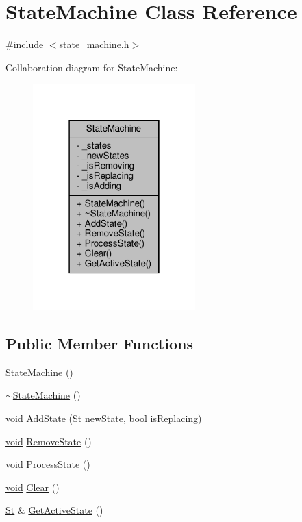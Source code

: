 \hypertarget{classStateMachine}{}\section{State\+Machine Class Reference}
\label{classStateMachine}


{\ttfamily \#include $<$state\+\_\+machine.\+h$>$}



Collaboration diagram for State\+Machine\+:
\nopagebreak
\begin{figure}[H]
\begin{center}
\leavevmode
\includegraphics[width=178pt]{classStateMachine__coll__graph}
\end{center}
\end{figure}
\subsection*{Public Member Functions}
\begin{DoxyCompactItemize}
\item 
\hyperlink{classStateMachine_a2fb07002510ea9141019559750acfab8}{State\+Machine} ()
\item 
\hyperlink{classStateMachine_a93d66cb2a89b186789d655a08b02674e}{$\sim$\+State\+Machine} ()
\item 
\hyperlink{imgui__impl__opengl3__loader_8h_ac668e7cffd9e2e9cfee428b9b2f34fa7}{void} \hyperlink{classStateMachine_a5efdf0c4ab0bdeae854ab9a0d071969b}{Add\+State} (\hyperlink{state__machine_8h_aa31b7a5a5d2d34ce28ae8e5c4624f788}{St} new\+State, bool is\+Replacing)
\item 
\hyperlink{imgui__impl__opengl3__loader_8h_ac668e7cffd9e2e9cfee428b9b2f34fa7}{void} \hyperlink{classStateMachine_aebefd3cef7db9e011e15f423061d1afc}{Remove\+State} ()
\item 
\hyperlink{imgui__impl__opengl3__loader_8h_ac668e7cffd9e2e9cfee428b9b2f34fa7}{void} \hyperlink{classStateMachine_a30f9ae4022e5177aeef777f4d7ea834f}{Process\+State} ()
\item 
\hyperlink{imgui__impl__opengl3__loader_8h_ac668e7cffd9e2e9cfee428b9b2f34fa7}{void} \hyperlink{classStateMachine_a7821c514a1e468c7fa891f2b5f5d102c}{Clear} ()
\item 
\hyperlink{state__machine_8h_aa31b7a5a5d2d34ce28ae8e5c4624f788}{St} \& \hyperlink{classStateMachine_a0b3150a42dd28593413d56df9ba5cb82}{Get\+Active\+State} ()
\end{DoxyCompactItemize}
